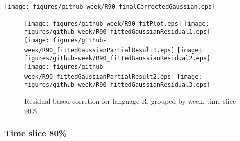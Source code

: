 \begin{center}
{\texttt{[image: figures/github-week/R90\_finalCorrectedGaussian.eps]}}
\end{center}

\FloatBarrier

\begin{figure}[t]
\centering
{}
{\texttt{[image: figures/github-week/R90\_fitPlot.eps]}}
{\texttt{[image: figures/github-week/R90\_fittedGaussianResidual1.eps]}}
{\texttt{[image: figures/github-week/R90\_fittedGaussianPartialResult1.eps]}}
{\texttt{[image: figures/github-week/R90\_fittedGaussianResidual2.eps]}}
{\texttt{[image: figures/github-week/R90\_fittedGaussianPartialResult2.eps]}}
{\texttt{[image: figures/github-week/R90\_fittedGaussianResidual3.eps]}}
\caption{Residual-based corretion for language R, grouped by week, time slice 90\%.}
\end{figure}


\FloatBarrier


\subsubsection{Time slice 80\%}

